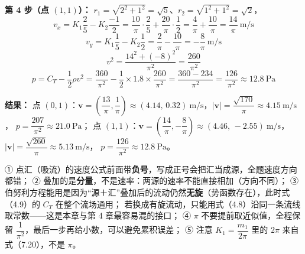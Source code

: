 \begin{jie}
\textbf{第 4 步（点 $(1,1)$）：} $r_1=\sqrt{2^2+1^2}=\sqrt5$、$r_2=\sqrt{1^2+1^2}=\sqrt2$，
\[
v_x=K_1\frac{2}{5}-K_2\frac{-1}{2}=\frac{10}{\pi}\cdot\frac{2}{5}+\frac{20}{\pi}\cdot\frac{1}{2}=\frac{4}{\pi}+\frac{10}{\pi}=\frac{14}{\pi}\ \mathrm{m/s}
\]
\[
v_y=K_1\frac{1}{5}-K_2\frac{1}{2}=\frac{2}{\pi}-\frac{10}{\pi}=-\frac{8}{\pi}\ \mathrm{m/s}
\]
\[
v^2=\frac{14^2+(-8)^2}{\pi^2}=\frac{260}{\pi^2}
\]
\[
p=C_T-\frac{1}{2}\rho v^2=\frac{360}{\pi^2}-\frac{1}{2}\times 1.8\times\frac{260}{\pi^2}
=\frac{360-234}{\pi^2}=\frac{126}{\pi^2}\approx 12.8\ \mathrm{Pa}
\]

\textbf{结果：}
点 $(0,1)$：$\bm v=\left(\dfrac{13}{\pi},\dfrac{1}{\pi}\right)\approx(4.14,\,0.32)\ \mathrm{m/s}$，$|\bm v|=\dfrac{\sqrt{170}}{\pi}\approx 4.15\ \mathrm{m/s}$，
$p=\dfrac{207}{\pi^2}\approx 21.0\ \mathrm{Pa}$；
点 $(1,1)$：$\bm v=\left(\dfrac{14}{\pi},-\dfrac{8}{\pi}\right)\approx(4.46,\,-2.55)\ \mathrm{m/s}$，$|\bm v|=\dfrac{\sqrt{260}}{\pi}\approx 5.13\ \mathrm{m/s}$，
$p=\dfrac{126}{\pi^2}\approx 12.8\ \mathrm{Pa}$。
\end{jie}

\begin{yicuo}
① 点汇（吸流）的速度公式前面带\textbf{负号}，写成正号会把汇当成源，全题速度方向都错；
② 叠加的是\textbf{分量}，不是速率：两源的速率不能直接相加（方向不同）；
③ 伯努利方程能用是因为“源＋汇”叠加后的流动仍然\textbf{无旋}（势函数存在），此时式（4.9）的 $C_T$ 在整个流场通用；
若换成有旋流动，只能用式（4.8）沿同一条流线取常数——这是本章与第 4 章最容易混的接口；
④ $\pi$ 不要提前取近似值，全程保留 $\dfrac{1}{\pi^2}$，最后一步再给小数，可以避免累积误差；
⑤ 注意 $K_1=\dfrac{m_1}{2\pi}$ 里的 $2\pi$ 来自式（7.20），不是 $\pi$。
\end{yicuo}
